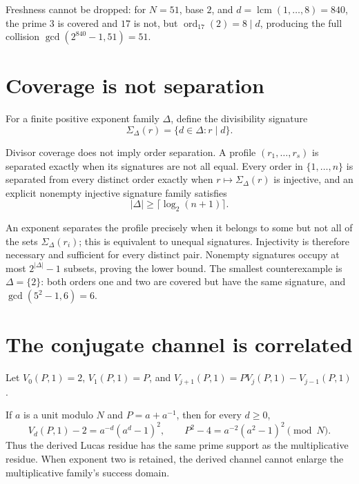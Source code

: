 \documentclass[11pt]{article}
\begin{document}
Freshness cannot be dropped: for \(N=51\), base \(2\), and
\(d=\operatorname{lcm}(1,\ldots,8)=840\), the prime \(3\) is covered and
\(17\) is not, but \(\operatorname{ord}_{17}(2)=8\mid d\), producing the
full collision \(\gcd(2^{840}-1,51)=51\).

\section{Coverage is not separation}

For a finite positive exponent family \(\Delta\), define the divisibility
signature
\[
  \Sigma_\Delta(r)=\{d\in\Delta:r\mid d\}.
\]

{}
Divisor coverage does not imply order
separation.  A profile \((r_1,\ldots,r_s)\) is separated exactly when its
signatures are not all equal.  Every order in \(\{1,\ldots,n\}\) is separated
from every distinct order exactly when \(r\mapsto\Sigma_\Delta(r)\) is
injective, and an explicit nonempty injective signature family satisfies
\[
  |\Delta|\ge\lceil\log_2(n+1)\rceil.
\]

\begin{claimproof}
An exponent separates the profile precisely when it belongs to some but not
all of the sets \(\Sigma_\Delta(r_i)\); this is equivalent to unequal
signatures.  Injectivity is therefore necessary and sufficient for every
distinct pair.  Nonempty signatures occupy at most \(2^{|\Delta|}-1\)
subsets, proving the lower bound.  The smallest counterexample is
\(\Delta=\{2\}\): both orders one and two are covered but have the same
signature, and \(\gcd(5^2-1,6)=6\).
\end{claimproof}

\section{The conjugate channel is correlated}

Let \(V_0(P,1)=2\), \(V_1(P,1)=P\), and
\(V_{j+1}(P,1)=PV_j(P,1)-V_{j-1}(P,1)\).

{}
If \(a\) is a unit modulo \(N\) and
\(P=a+a^{-1}\), then for every \(d\ge0\),
\[
 V_d(P,1)-2=a^{-d}(a^d-1)^2,\qquad
 P^2-4=a^{-2}(a^2-1)^2\pmod N.
\]
Thus the derived Lucas residue has the same prime support as the
multiplicative residue.  When exponent two is retained, the derived channel
cannot enlarge the multiplicative family's success domain.
\end{document}
